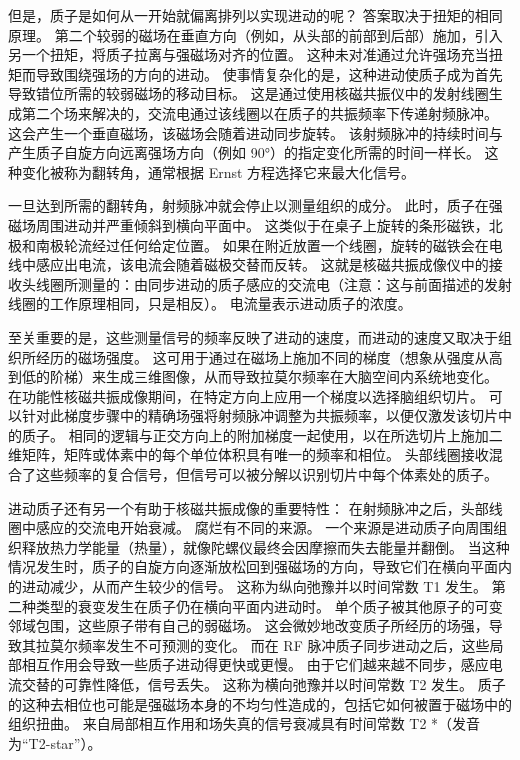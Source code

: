 但是，质子是如何从一开始就偏离排列以实现进动的呢？ 
答案取决于扭矩的相同原理。 
第二个较弱的磁场在垂直方向（例如，从头部的前部到后部）施加，引入另一个扭矩，将质子拉离与强磁场对齐的位置。 
这种未对准通过允许强场充当扭矩而导致围绕强场的方向的进动。 
使事情复杂化的是，这种进动使质子成为首先导致错位所需的较弱磁场的移动目标。
这是通过使用核磁共振仪中的发射线圈生成第二个场来解决的，交流电通过该线圈以在质子的共振频率下传递射频脉冲。 
这会产生一个垂直磁场，该磁场会随着进动同步旋转。 
该射频脉冲的持续时间与产生质子自旋方向远离强场方向（例如 90°）的指定变化所需的时间一样长。 
这种变化被称为翻转角，通常根据 Ernst 方程选择它来最大化信号。


一旦达到所需的翻转角，射频脉冲就会停止以测量组织的成分。
此时，质子在强磁场周围进动并严重倾斜到横向平面中。 
这类似于在桌子上旋转的条形磁铁，北极和南极轮流经过任何给定位置。
如果在附近放置一个线圈，旋转的磁铁会在电线中感应出电流，该电流会随着磁极交替而反转。
这就是核磁共振成像仪中的接收头线圈所测量的：由同步进动的质子感应的交流电（注意：这与前面描述的发射线圈的工作原理相同，只是相反）。
电流量表示进动质子的浓度。


至关重要的是，这些测量信号的频率反映了进动的速度，而进动的速度又取决于组织所经历的磁场强度。
这可用于通过在磁场上施加不同的梯度（想象从强度从高到低的阶梯）来生成三维图像，从而导致拉莫尔频率在大脑空间内系统地变化。
在功能性核磁共振成像期间，在特定方向上应用一个梯度以选择脑组织切片。
可以针对此梯度步骤中的精确场强将射频脉冲调整为共振频率，以便仅激发该切片中的质子。
相同的逻辑与正交方向上的附加梯度一起使用，以在所选切片上施加二维矩阵，矩阵或体素中的每个单位体积具有唯一的频率和相位。
头部线圈接收混合了这些频率的复合信号，但信号可以被分解以识别切片中每个体素处的质子。


进动质子还有另一个有助于核磁共振成像的重要特性：
在射频脉冲之后，头部线圈中感应的交流电开始衰减。 
腐烂有不同的来源。 
一个来源是进动质子向周围组织释放热力学能量（热量），就像陀螺仪最终会因摩擦而失去能量并翻倒。 
当这种情况发生时，质子的自旋方向逐渐放松回到强磁场的方向，导致它们在横向平面内的进动减少，从而产生较少的信号。 
这称为纵向弛豫并以时间常数 T1 发生。 
第二种类型的衰变发生在质子仍在横向平面内进动时。 
单个质子被其他原子的可变邻域包围，这些原子带有自己的弱磁场。 
这会微妙地改变质子所经历的场强，导致其拉莫尔频率发生不可预测的变化。 
而在 RF 脉冲质子同步进动之后，这些局部相互作用会导致一些质子进动得更快或更慢。 
由于它们越来越不同步，感应电流交替的可靠性降低，信号丢失。 
这称为横向弛豫并以时间常数 T2 发生。 
质子的这种去相位也可能是强磁场本身的不均匀性造成的，包括它如何被置于磁场中的组织扭曲。 
来自局部相互作用和场失真的信号衰减具有时间常数 T2 *（发音为“T2-star”）。



